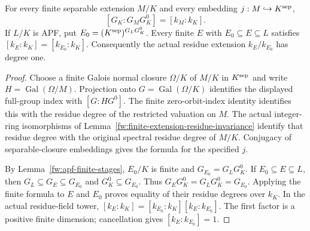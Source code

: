 \begin{lemma}
\label{fw:apf-residue-stabilization}
\leanok
For every finite separable extension $M/K$ and every embedding
$j:M\hookrightarrow K^{\rm sep}$,
\[
 [G_K:G_MG_K^0]=[k_M:k_K].
\]
If $L/K$ is APF, put $E_0=(K^{\rm sep})^{G_LG_K^0}$.
Every finite $E$ with $E_0\subseteq E\subseteq L$ satisfies
$[k_E:k_K]=[k_{E_0}:k_K]$. Consequently the actual residue
extension $k_E/k_{E_0}$ has degree one.
\end{lemma}
\begin{proof}
Choose a finite Galois normal closure $\Omega/K$ of $M/K$
in $K^{\rm sep}$ and write $H=\operatorname{Gal}(\Omega/M)$.
Projection onto $G=\operatorname{Gal}(\Omega/K)$ identifies
the displayed full-group index with $[G:HG^0]$.
The finite zero-orbit-index identity identifies this with
the residue degree of the restricted valuation on $M$.
The actual integer-ring isomorphisms of
Lemma~\ref{fw:finite-extension-residue-invariance} identify
that residue degree with the original spectral residue degree
of $M/K$. Conjugacy of separable-closure embeddings gives
the formula for the specified $j$.

By Lemma~\ref{fw:apf-finite-stages}, $E_0/K$ is finite and
$G_{E_0}=G_LG_K^0$. If $E_0\subseteq E\subseteq L$, then
$G_L\subseteq G_E\subseteq G_{E_0}$ and $G_K^0\subseteq G_{E_0}$.
Thus $G_EG_K^0=G_LG_K^0=G_{E_0}$. Applying the finite
formula to $E$ and $E_0$ proves equality of their residue
degrees over $k_K$. In the actual residue-field tower,
$[k_E:k_K]=[k_{E_0}:k_K][k_E:k_{E_0}]$.
The first factor is a positive finite dimension; cancellation
gives $[k_E:k_{E_0}]=1$.
\end{proof}

